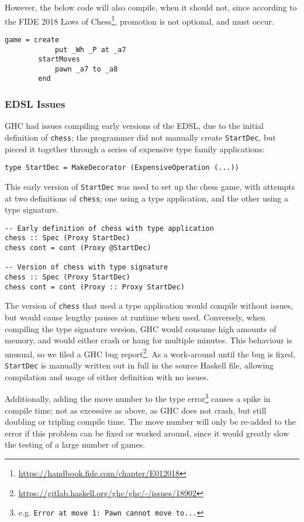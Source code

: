 \documentclass[12pt, a4paper, bibliography=totocnumbered]{scrartcl}
\begin{document}
However, the below code will also compile, when it should not, since according to the FIDE 2018 Laws of Chess\footnote{\url{https://handbook.fide.com/chapter/E012018}}, promotion is not optional, and must occur.

\begin{lstlisting}
game = create
            put _Wh _P at _a7
        startMoves
            pawn _a7 to _a8
        end
\end{lstlisting}

\subsubsection{EDSL Issues}

GHC had issues compiling early versions of the EDSL, due to the initial definition of \lstinline{chess}; the programmer did not manually create \lstinline{StartDec}, but pieced it together through a series of expensive type family applications:

\begin{lstlisting}
type StartDec = MakeDecorator (ExpensiveOperation (...))
\end{lstlisting}

This early version of \lstinline{StartDec} was used to set up the chess game, with attempts at two definitions of \lstinline{chess}; one using a type application, and the other using a type signature.

\begin{lstlisting}
-- Early definition of chess with type application
chess :: Spec (Proxy StartDec)
chess cont = cont (Proxy @StartDec)

-- Version of chess with type signature
chess :: Spec (Proxy StartDec)
chess cont = cont (Proxy :: Proxy StartDec)
\end{lstlisting}

The version of \lstinline{chess} that used a type application would compile without issues, but would cause lengthy pauses at runtime when used. Conversely, when compiling the type signature version, GHC would consume high amounts of memory, and would either crash or hang for multiple minutes. This behaviour is unusual, so we filed a GHC bug report\footnote{\url{https://gitlab.haskell.org/ghc/ghc/-/issues/18902}}. As a work-around until the bug is fixed, \lstinline{StartDec} is manually written out in full in the source Haskell file, allowing compilation and usage of either definition with no issues.

Additionally, adding the move number to the type error\footnote{e.g. \lstinline{Error at move 1: Pawn cannot move to...}} causes a spike in compile time; not as excessive as above, as GHC does not crash, but still doubling or tripling compile time. The move number will only be re-added to the error if this problem can be fixed or worked around, since it would greatly slow the testing of a large number of games.
\end{document}
